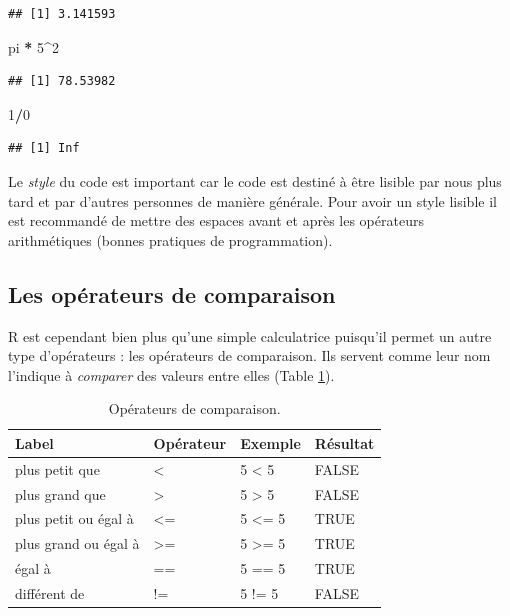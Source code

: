 \documentclass[
]{book}
\newenvironment{Shaded}{\begin{snugshade}}{\end{snugshade}}
\newcommand{\DecValTok}[1]{\textcolor[rgb]{0.00,0.00,0.81}{#1}}
\newcommand{\NormalTok}[1]{#1}
\newcommand{\OperatorTok}[1]{\textcolor[rgb]{0.81,0.36,0.00}{\textbf{#1}}}
\newcommand{\StringTok}[1]{\textcolor[rgb]{0.31,0.60,0.02}{#1}}
\begin{document}
\begin{verbatim}
## [1] 3.141593
\end{verbatim}

\begin{Shaded}
\begin{Highlighting}[]
\NormalTok{pi }\OperatorTok{*}\StringTok{ }\DecValTok{5}\OperatorTok{^}\DecValTok{2}
\end{Highlighting}
\end{Shaded}

\begin{verbatim}
## [1] 78.53982
\end{verbatim}

\begin{Shaded}
\begin{Highlighting}[]
\DecValTok{1}\OperatorTok{/}\DecValTok{0}
\end{Highlighting}
\end{Shaded}

\begin{verbatim}
## [1] Inf
\end{verbatim}

Le \emph{style} du code est important car le code est destiné à être lisible par nous plus tard et par d'autres personnes de manière générale. Pour avoir un style lisible il est recommandé de mettre des espaces avant et après les opérateurs arithmétiques (bonnes pratiques de programmation).

\hypertarget{l011opcomp}{%
\subsection{Les opérateurs de comparaison}\label{l011opcomp}}

R est cependant bien plus qu'une simple calculatrice puisqu'il permet un autre type d'opérateurs : les opérateurs de comparaison. Ils servent comme leur nom l'indique à \emph{comparer} des valeurs entre elles (Table \ref{tab:tabOpCom}).

\begin{table}

\caption{\label{tab:tabOpCom}Opérateurs de comparaison.\label{tab:tabOpCom}}
\centering
\begin{tabular}[t]{l|l|l|l}
\hline
Label & Opérateur & Exemple & Résultat\\
\hline
plus petit que & < & 5 < 5 & FALSE\\
\hline
plus grand que & > & 5 > 5 & FALSE\\
\hline
plus petit ou égal à & <= & 5 <= 5 & TRUE\\
\hline
plus grand ou égal à & >= & 5 >= 5 & TRUE\\
\hline
égal à & == & 5 == 5 & TRUE\\
\hline
différent de & != & 5 != 5 & FALSE\\
\hline
\end{tabular}
\end{table}
\end{document}
